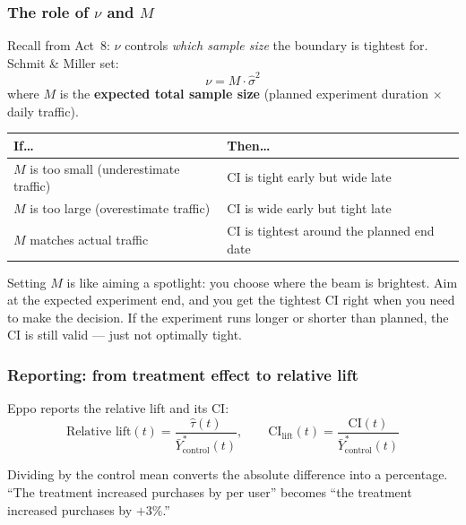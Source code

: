 \documentclass[12pt, a4paper]{article}
\begin{document}
\subsubsection*{The role of $\nu$ and $M$}

Recall from Act~8: $\nu$ controls \emph{which sample size} the boundary is
tightest for.  Schmit \& Miller set:
\[
  \nu = M \cdot \hat{\sigma}^2
\]
where $M$ is the \textbf{expected total sample size} (planned experiment
duration $\times$ daily traffic).

\begin{center}
\begin{tabular}{@{} l l @{}}
\toprule
\textbf{If\ldots} & \textbf{Then\ldots} \\
\midrule
$M$ is too small (underestimate traffic) & CI is tight early but wide late \\
$M$ is too large (overestimate traffic) & CI is wide early but tight late \\
$M$ matches actual traffic & CI is tightest around the planned end date \\
\bottomrule
\end{tabular}
\end{center}

\begin{plainlanguage}
Setting $M$ is like aiming a spotlight: you choose where the beam is brightest.
Aim at the expected experiment end, and you get the tightest CI right when you
need to make the decision.  If the experiment runs longer or shorter than
planned, the CI is still valid --- just not optimally tight.
\end{plainlanguage}

\subsubsection*{Reporting: from treatment effect to relative lift}

Eppo reports the relative lift and its CI:
\[
  \text{Relative lift}(t) = \frac{\hat{\tau}(t)}{\bar{Y}^*_{\text{control}}(t)},
  \qquad
  \text{CI}_{\text{lift}}(t) = \frac{\text{CI}(t)}{\bar{Y}^*_{\text{control}}(t)}
\]

\begin{plainlanguage}
Dividing by the control mean converts the absolute difference into a
percentage.  ``The treatment increased purchases by  per user''
becomes ``the treatment increased purchases by $+3\%$.''
\end{plainlanguage}
\end{document}
